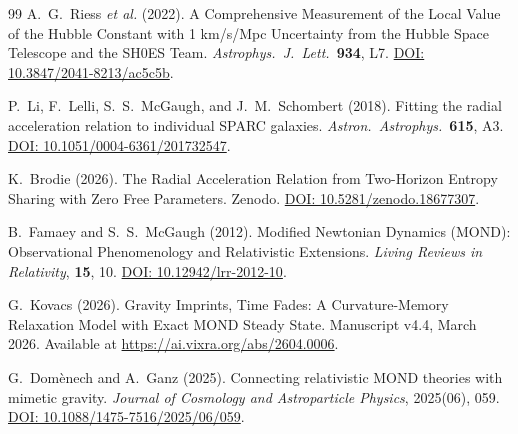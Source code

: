 \documentclass[aps,prd,twocolumn,superscriptaddress,nofootinbib]{revtex4-2}
\begin{document}
\begin{thebibliography}{99}
A.~G.~Riess \textit{et al.} (2022).
A Comprehensive Measurement of the Local Value of the Hubble Constant with 1 km/s/Mpc Uncertainty from the Hubble Space Telescope and the SH0ES Team.
\textit{Astrophys.\ J.\ Lett.}\ \textbf{934}, L7.
\href{https://doi.org/10.3847/2041-8213/ac5c5b}{DOI: 10.3847/2041-8213/ac5c5b}.

P.~Li, F.~Lelli, S.~S.~McGaugh, and J.~M.~Schombert (2018).
Fitting the radial acceleration relation to individual SPARC galaxies.
\textit{Astron.\ Astrophys.}\ \textbf{615}, A3.
\href{https://doi.org/10.1051/0004-6361/201732547}{DOI: 10.1051/0004-6361/201732547}.

K.~Brodie (2026).
The Radial Acceleration Relation from Two-Horizon Entropy Sharing with Zero Free Parameters.
Zenodo. \href{https://doi.org/10.5281/zenodo.18677307}{DOI: 10.5281/zenodo.18677307}.

B.~Famaey and S.~S.~McGaugh (2012).
Modified Newtonian Dynamics (MOND): Observational Phenomenology and Relativistic Extensions.
\textit{Living Reviews in Relativity}, \textbf{15}, 10.
\href{https://doi.org/10.12942/lrr-2012-10}{DOI: 10.12942/lrr-2012-10}.

G.~Kovacs (2026).
Gravity Imprints, Time Fades: A Curvature-Memory Relaxation Model with Exact MOND Steady State.
Manuscript v4.4, March 2026.
Available at \url{https://ai.vixra.org/abs/2604.0006}.

G.~Dom\`enech and A.~Ganz (2025).
Connecting relativistic MOND theories with mimetic gravity.
\textit{Journal of Cosmology and Astroparticle Physics}, 2025(06), 059.
\href{https://doi.org/10.1088/1475-7516/2025/06/059}{DOI: 10.1088/1475-7516/2025/06/059}.

\end{thebibliography}
\end{document}
